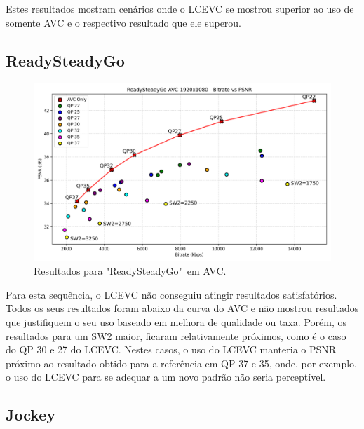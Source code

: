 Estes resultados mostram cenários onde o \acrshort{LCEVC} se mostrou superior ao uso de somente
\acrshort{AVC} e o respectivo resultado que ele superou.
 
\subsection{ReadySteadyGo}

\begin{figure}[h]
    \centering
    \includegraphics[width=1.0\textwidth]{img/ReadySteadyGo-AVC.png}
    \caption{Resultados para "ReadySteadyGo"\ em \acrshort{AVC}. \cite{uvg_dataset}}
    \label{fig:RSG}
\end{figure}

Para esta sequência, o \acrshort{LCEVC} não conseguiu atingir resultados satisfatórios.
Todos os seus resultados foram abaixo da curva do \acrshort{AVC} e não mostrou resultados
que justifiquem o seu uso baseado em melhora de qualidade ou taxa. Porém, os resultados
para um SW2 maior, ficaram relativamente próximos, como é o caso do QP 30 e 27 do \acrshort{LCEVC}.
Nestes casos, o uso do \acrshort{LCEVC} manteria o \acrshort{PSNR} próximo ao resultado
obtido para a referência em QP 37 e 35, onde, por exemplo, o uso do \acrshort{LCEVC} para se adequar a 
um novo padrão não seria perceptível.


\subsection{Jockey}

